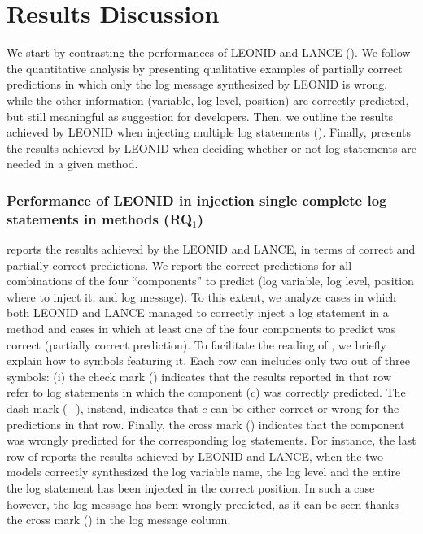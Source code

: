 \section{Results Discussion} \label{sec:results}

We start by contrasting the performances of LEONID and LANCE (). We follow the quantitative analysis by presenting qualitative examples of partially correct predictions in which only the log message synthesized by LEONID is wrong, while the other information (\ie variable, log level, position) are correctly predicted, but still meaningful as suggestion for developers. Then, we outline the results achieved by LEONID when injecting multiple log statements (). Finally,  presents the results achieved by LEONID when deciding whether or not log statements are needed in a given \java method.


\subsubsection{Performance of LEONID in injection single complete log statements in \java methods (RQ$_{1}$)}
\label{sec:rq1}

 reports the results achieved by the LEONID and LANCE, in terms of correct and partially correct predictions. We report the correct predictions for all combinations of the four ``components'' to predict (\ie log variable, log level, position where to inject it, and log message). To this extent, we analyze cases in which both LEONID and LANCE managed to correctly inject a log statement in a \java method and cases in which  at least one of the four components to predict was correct (\ie partially correct prediction).
To facilitate the reading of , we briefly explain how to symbols featuring it.
Each row can includes only two out of three symbols: (i) the check mark (\cmark) indicates that the results reported in that row refer to log statements in which the component ($c$) was correctly predicted. The dash mark ($-$), instead, indicates that $c$ can be either correct or wrong for the predictions in that row. Finally, the cross mark (\xmark) indicates that the component was wrongly predicted for the corresponding log statements.
For instance, the last row of  reports the results achieved by LEONID and LANCE, when the two models correctly synthesized the log variable name, the log level and the entire the log statement has been injected in the correct position. In such a case however, the log message has been wrongly predicted, as it can be seen thanks the cross mark (\xmark) in the log message column.

